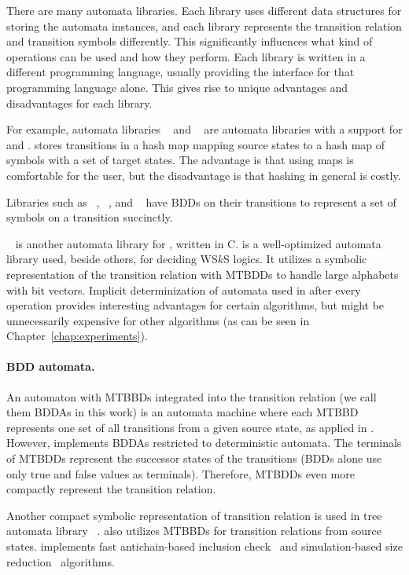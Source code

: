 There are many automata libraries.
Each library uses different data structures for storing the automata instances,
and each library represents the transition relation and transition symbols differently.
This significantly influences what kind of operations can be used and how they perform.
Each library is written in a different programming language, usually providing the interface for that programming language alone.
This gives rise to unique advantages and disadvantages for each library.

For example, automata libraries \fado~\cite{fado} and \automatapy~\cite{automatapy} are automata libraries with a support for \nfas and \dfas.
\automatapy stores transitions in a hash map mapping source states to a hash map of symbols with a set of target states.
The advantage is that using maps is comfortable for the user, but the disadvantage is that hashing in general is costly.

Libraries such as \spot~\cite{spot}, \mosel~\cite{mosel}, and \owl~\cite{owl} have BDDs on their transitions to represent a set of symbols on a transition succinctly.

\mona~\cite{mona} is another automata library for \dfas, written in C.
\mona is a well-optimized automata library used, beside others, for deciding WS$k$S logics.
It utilizes a symbolic representation of the transition relation with MTBDDs to handle large alphabets with bit vectors.
Implicit determinization of automata used in \mona after every operation provides interesting advantages for certain algorithms, but might be unnecessarily expensive for other algorithms (as can be seen in Chapter~\ref{chap:experiments}).

\paragraph{BDD automata.}
An automaton with MTBBDs integrated into the transition relation (we call them BDDAs in this work) is an automata machine where each MTBBD represents one set of all transitions from a given source state, as applied in \mona.
However, \mona implements BDDAs restricted to deterministic automata.
The terminals of MTBDDs represent the successor states of the transitions (BDDs alone use only true and false values as terminals).
Therefore, MTBDDs even more compactly represent the transition relation.

Another compact symbolic representation of transition relation is used in tree automata library \vata~\cite{vata}.
\vata also utilizes MTBBDs for transition relations from source states.
\vata implements fast antichain-based inclusion check~\cite{doyen-antichain-10} and simulation-based size reduction~\cite{ranzato_efficient_2010, treesimulation08} algorithms.

